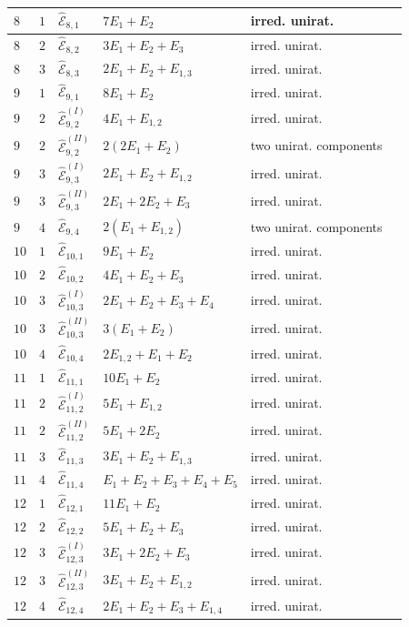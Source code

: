 \documentclass[11pt]{amsart}
\theoremstyle{definition}
\def\E{{\mathcal E}}
\begin{document}
\begin{minipage}[t]{\textwidth/2-1mm}
{\begin{tabular}{ |l | l |l|l|l|l|}
$8$ & $1$ & $\widehat{\E}_{8,1}$ & $7E_1+E_2$ & irred. unirat. \\\hline
$8$ & $2$ & $\widehat{\E}_{8,2}$ &  $3E_1+E_2+E_3$  & irred. unirat. \\\hline
$8$ & $3$ & $\widehat{\E}_{8,3}$ &  $2E_1+E_2+E_{1,3}$  & irred. unirat. \\\hline\hline

$9$ & $1$ & $\widehat{\E}_{9,1}$ & $8E_1+E_2$ & irred. unirat. \\\hline
$9$ & $2$ & $\widehat{\E}_{9,2}^{(I)}$ &  $4E_1+E_{1,2}$  & irred. unirat. \\
$9$ & $2$ & $\widehat{\E}_{9,2}^{(II)}$ &  $2(2E_1+E_2)$  & two  unirat. components
\\ \hline
$9$ & $3$ & $\widehat{\E}_{9,3}^{(I)}$ &  $2E_1+E_2+E_{1,2}$  & irred. unirat. \\
$9$ & $3$ & $\widehat{\E}_{9,3}^{(II)}$ &  $2E_1+2E_2+E_3$ & irred. unirat. \\ \hline 
$9$ & $4$ & $\widehat{\E}_{9,4}$ &  $2(E_1+E_{1,2})$ & two  unirat. components
\\ \hline\hline

$10$ & $1$ & $\widehat{\E}_{10,1}$ & $9E_1+E_2$ & irred. unirat. \\\hline
$10$ & $2$ & $\widehat{\E}_{10,2}$ &  $4E_1+E_2+E_3$  & irred. unirat. \\ \hline 
$10$ & $3$ & $\widehat{\E}_{10,3}^{(I)}$ &  $2E_1+E_2+E_3+E_4$  & irred. unirat. \\
$10$ & $3$ & $\widehat{\E}_{10,3}^{(II)}$ &   $3(E_1+E_2)$  & irred. unirat. \\  \hline 
$10$ & $4$ & $\widehat{\E}_{10,4}$ &  $2E_{1,2} + E_1+E_2$  &
irred. unirat. \\ \hline\hline



$11$ & $1$ & $\widehat{\E}_{11,1}$ & $10E_1+E_2$ & irred. unirat. \\\hline
$11$ & $2$ & $\widehat{\E}_{11,2}^{(I)}$ & $5E_1+E_{1,2}$ & irred. unirat. \\
$11$ & $2$ & $\widehat{\E}_{11,2}^{(II)}$ & $5E_1+2E_{2}$ & irred. unirat. \\\hline
$11$ & $3$ & $\widehat{\E}_{11,3}$ & $3E_1+E_{2}+E_{1,3}$ & irred. unirat. \\\hline
$11$ & $4$ & $\widehat{\E}_{11,4}$ & $E_1+E_{2}+E_{3}+E_4+E_5$ & irred. unirat. \\\hline \hline



$12$ & $1$ & $\widehat{\E}_{12,1}$ & $11E_1+E_2$ & irred. unirat. \\\hline
$12$ & $2$ & $\widehat{\E}_{12,2}$ & $5E_1+E_2+E_3$ & irred. unirat. \\\hline
$12$ & $3$ & $\widehat{\E}_{12,3}^{(I)}$ & $3E_1+2E_2+E_3$ & irred. unirat. \\
$12$ & $3$ & $\widehat{\E}_{12,3}^{(II)}$ &  $3E_1+E_2+E_{1,2}$ & irred. unirat. \\\hline
$12$ & $4$ & $\widehat{\E}_{12,4}$ & $2E_1+E_2+E_3+E_{1,4}$ &
irred. unirat. \\\hline\hline


\end{tabular}}
\end{minipage}
\end{document}
